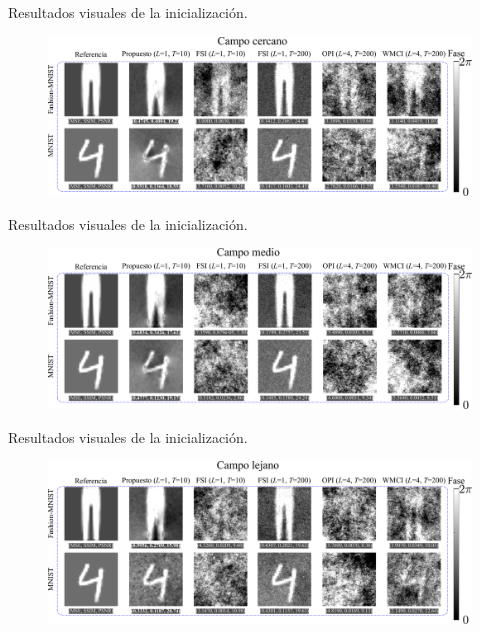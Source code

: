 \documentclass[aspectratio=169,t,xcolor=table]{beamer}
\begin{document}
\begin{frame}{Resultados visuales de la inicialización.}
    \vfill    
    \begin{figure}
        \centering
        \includegraphics[width=\linewidth]{images/resultados/visual_cercano.pdf}
    \end{figure}
    \vfill
\end{frame}

\begin{frame}{Resultados visuales de la inicialización.}
    \vfill    
    \begin{figure}
        \centering
        \includegraphics[width=\linewidth]{images/resultados/visual_medio.pdf}
    \end{figure}
    \vfill
\end{frame}

\begin{frame}{Resultados visuales de la inicialización.}
    \vfill    
    \begin{figure}
        \centering
        \includegraphics[width=\linewidth]{images/resultados/visual_lejano.pdf}
    \end{figure}
    \vfill
\end{frame}
\end{document}
